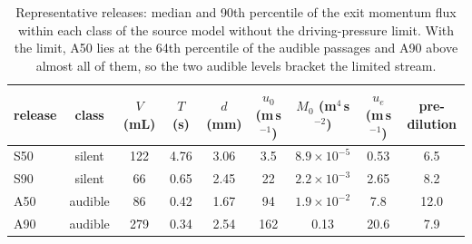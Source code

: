 \documentclass[11pt]{article}
\begin{document}
\begin{table}
\caption{Representative releases: median and 90th percentile of the exit momentum flux within each class of the
source model without the driving-pressure limit. With the limit, A50 lies at the 64th percentile of the audible
passages and A90 above almost all of them, so the two audible levels bracket the limited stream.}
\label{tab:releases}
\small
\setlength{\tabcolsep}{4pt}
\begin{tabular}{lcccccccc}
\toprule
release & class & $V$ (mL) & $T$ (s) & $d$ (mm) & $u_0$ (m\,s$^{-1}$) & $M_0$ (m$^4$\,s$^{-2}$) & $u_e$ (m\,s$^{-1}$) & pre-dilution \\
\midrule
S50 & silent & 122 & 4.76 & 3.06 & 3.5 & $8.9\times10^{-5}$ & 0.53 & 6.5 \\
S90 & silent & 66 & 0.65 & 2.45 & 22 & $2.2\times10^{-3}$ & 2.65 & 8.2 \\
A50 & audible & 86 & 0.42 & 1.67 & 94 & $1.9\times10^{-2}$ & 7.8 & 12.0 \\
A90 & audible & 279 & 0.34 & 2.54 & 162 & 0.13 & 20.6 & 7.9 \\
\bottomrule
\end{tabular}
\end{table}
\end{document}
